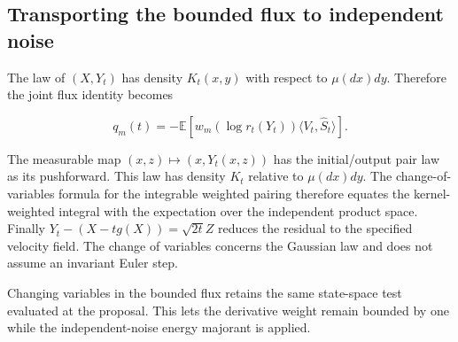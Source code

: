 \documentclass[11pt,a4paper]{report}
\begin{document}
\subsection{\texorpdfstring{Transporting the bounded flux to independent noise}{Transporting the bounded flux to independent noise}}
\label{report-step-UnadjustedLangevin-LSI-GaussianEntropyIdentity-lean-15}


The law of \((X,Y_t)\) has density \(K_t(x,y)\) with respect to \(\mu(dx)dy\). Therefore the joint flux identity becomes

\[q_m(t)=-\mathbb E\!\left[w_m(\log r_t(Y_t))\langle V_t,\widehat S_t\rangle\right].\]

The measurable map \((x,z)\mapsto(x,Y_t(x,z))\) has the initial/\allowbreak{}output pair law as its pushforward. This law has density \(K_t\) relative to \(\mu(dx)dy\). The change-of-variables formula for the integrable weighted pairing therefore equates the kernel-weighted integral with the expectation over the independent product space. Finally \(Y_t-(X-tg(X))=\sqrt{2t}Z\) reduces the residual to the specified velocity field. The change of variables concerns the Gaussian law and does not assume an invariant Euler step.



Changing variables in the bounded flux retains the same state-space test evaluated at the proposal. This lets the derivative weight remain bounded by one while the independent-noise energy majorant is applied.
\end{document}
